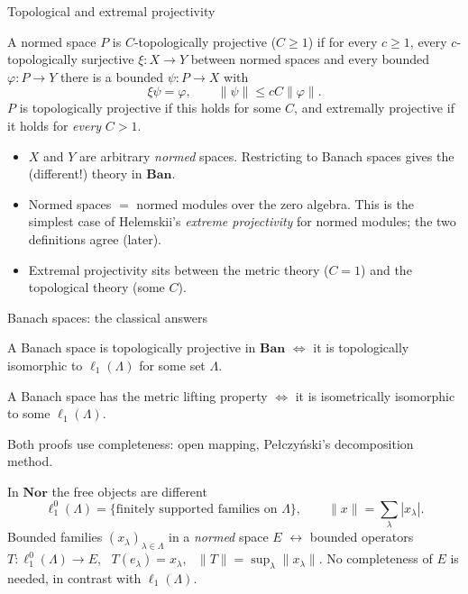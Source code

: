 \documentclass[10pt,aspectratio=169]{beamer}
\newcommand{\Nor}{\mathbf{Nor}}
\newcommand{\Ban}{\mathbf{Ban}}
\newcommand{\lo}[1]{\ell_1^0(#1)}
\newcommand{\ellone}[1]{\ell_1(#1)}
\begin{document}
\begin{frame}{Topological and extremal projectivity}
  \begin{definition}
    A normed space $P$ is \alert{$C$-topologically projective} ($C\ge1$) if for
    every $c\ge1$, every $c$-topologically surjective $\xi\colon X\to Y$ between
    normed spaces and every bounded $\varphi\colon P\to Y$ there is a bounded
    $\psi\colon P\to X$ with
    \[
      \xi\psi=\varphi,\qquad \|\psi\|\le cC\|\varphi\| .
    \]
    $P$ is \alert{topologically projective} if this holds for some $C$, and
    \alert{extremally projective} if it holds for \emph{every} $C>1$.
  \end{definition}
  \begin{itemize}
    \item $X$ and $Y$ are arbitrary \emph{normed} spaces. Restricting to Banach
      spaces gives the (different!) theory in $\Ban$.
    \item Normed spaces $=$ normed modules over the zero algebra. This is the
      simplest case of Helemskii's \emph{extreme projectivity} for normed modules;
      the two definitions agree (later).
    \item Extremal projectivity sits between the metric theory ($C=1$) and the
      topological theory (some $C$).
  \end{itemize}
\end{frame}

\begin{frame}{Banach spaces: the classical answers}
  \begin{theorem}[K\"othe 1966]
    A Banach space is topologically projective in $\Ban$ $\iff$ it is
    topologically isomorphic to $\ellone\Lambda$ for some set $\Lambda$.
  \end{theorem}
  \begin{theorem}[Grothendieck 1955]
    A Banach space has the metric lifting property $\iff$ it is isometrically
    isomorphic to some $\ellone\Lambda$.
  \end{theorem}
  Both proofs use completeness: open mapping, Pe{\l}czy\'nski's decomposition method.
  \begin{alertblock}{In $\Nor$ the free objects are different}
    \[
      \lo\Lambda=\{\text{finitely supported families on }\Lambda\},\qquad
      \|x\|=\sum_\lambda|x_\lambda| .
    \]
    Bounded families ${(x_\lambda)}_{\lambda\in\Lambda}$ in a \emph{normed} space $E$
    $\leftrightarrow$ bounded operators $T\colon\lo\Lambda\to E$, \
    $T(e_\lambda)=x_\lambda$, \ $\|T\|=\sup_\lambda\|x_\lambda\|$.
    No completeness of $E$ is needed, in contrast with $\ellone\Lambda$.
  \end{alertblock}
\end{frame}
\end{document}
